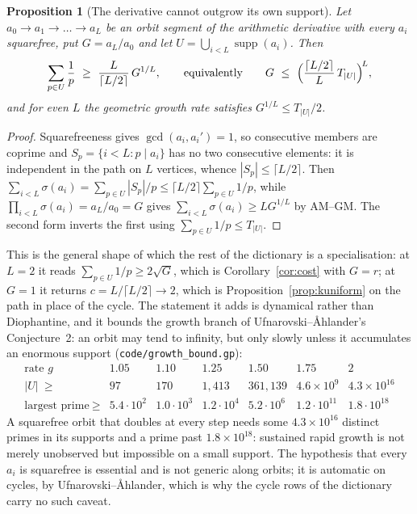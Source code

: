 \documentclass[11pt]{article}
\newtheorem{proposition}[theorem]{Proposition}
\theoremstyle{definition}
\begin{document}
\begin{proposition}[The derivative cannot outgrow its own support]\label{prop:growth}
Let $a_0\to a_1\to\dots\to a_L$ be an orbit segment of the arithmetic derivative with every $a_i$
squarefree, put $G=a_L/a_0$ and let $U=\bigcup_{i<L}\operatorname{supp}(a_i)$. Then
\[ \sum_{p\in U}\frac1p\ \ge\ \frac{L}{\lceil L/2\rceil}\,G^{1/L},
\qquad\text{equivalently}\qquad
G\ \le\ \Bigl(\frac{\lceil L/2\rceil}{L}\,T_{|U|}\Bigr)^{\!L}, \]
and for even $L$ the geometric growth rate satisfies $G^{1/L}\le T_{|U|}/2$.
\end{proposition}
\begin{proof}
Squarefreeness gives $\gcd(a_i,a_i')=1$, so consecutive members are coprime and
$S_p=\{i<L:p\mid a_i\}$ has no two consecutive elements: it is independent in the path on $L$
vertices, whence $|S_p|\le\lceil L/2\rceil$. Then $\sum_{i<L}\sigma(a_i)=\sum_{p\in U}|S_p|/p\le
\lceil L/2\rceil\sum_{p\in U}1/p$, while $\prod_{i<L}\sigma(a_i)=a_L/a_0=G$ gives
$\sum_{i<L}\sigma(a_i)\ge LG^{1/L}$ by AM--GM. The second form inverts the first using
$\sum_{p\in U}1/p\le T_{|U|}$.
\end{proof}

This is the general shape of which the rest of the dictionary is a specialisation: at $L=2$ it reads
$\sum_{p\in U}1/p\ge2\sqrt G$, which is Corollary~\ref{cor:cost} with $G=r$; at $G=1$ it returns
$c=L/\lceil L/2\rceil\to2$, which is Proposition~\ref{prop:kuniform} on the path in place of the
cycle. The statement it adds is dynamical rather than Diophantine, and it bounds the growth branch
of Ufnarovski--\AA hlander's Conjecture~2: an orbit may tend to infinity, but only slowly unless it
accumulates an enormous support \textup{(\texttt{code/growth\_bound.gp})}:
\[
\begin{array}{l|cccccc}
\text{rate }g & 1.05 & 1.10 & 1.25 & 1.50 & 1.75 & 2\\\hline
|U|\ \ge & 97 & 170 & 1{,}413 & 361{,}139 & 4.6\times10^{9} & 4.3\times10^{16}\\
\text{largest prime}\ \ge & 5.4\!\cdot\!10^{2} & 1.0\!\cdot\!10^{3} & 1.2\!\cdot\!10^{4} &
 5.2\!\cdot\!10^{6} & 1.2\!\cdot\!10^{11} & 1.8\!\cdot\!10^{18}
\end{array}
\]
A squarefree orbit that doubles at every step needs some $4.3\times10^{16}$ distinct primes in its
supports and a prime past $1.8\times10^{18}$: sustained rapid growth is not merely unobserved but
impossible on a small support. The hypothesis that every $a_i$ is squarefree is essential and is not
generic along orbits; it is automatic on cycles, by Ufnarovski--\AA hlander, which is why the cycle
rows of the dictionary carry no such caveat.
\end{document}
